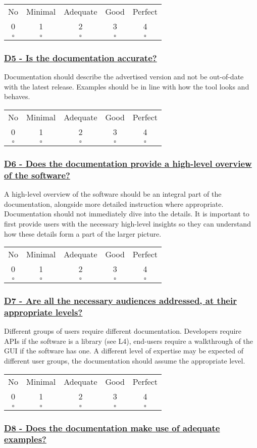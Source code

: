 \documentclass[a4paper,11pt]{article}
\newcommand{\criterion}[2]{\subsubsection*{\underline{#1 - #2}}\label{id:#1}}
\newcommand\CheckTable{%
  \begin{tabular}{ccccc}
    No & Minimal & Adequate & Good & Perfect \\
    0 & 1 & 2 & 3 & 4 \\
    \hline
    $\square$ & $\square$ & $\square$ & $\square$ & $\square$ \\
  \end{tabular}%
}
\begin{document}
%
%
%

\CheckTable

\newcommand{\dFiveID}{D5}
\newcommand{\dFiveText}{Is the documentation accurate?}
\criterion{\dFiveID}{\dFiveText}

Documentation should describe the advertised version and not be out-of-date
with the latest release. Examples should be in line with how the tool looks and
behaves.

\CheckTable

\newcommand{\dSixID}{D6}
\newcommand{\dSixText}{Does the documentation provide a high-level overview of the software?}
\criterion{\dSixID}{\dSixText}

A high-level overview of the software should be an integral part of the
documentation, alongside more detailed instruction where appropriate.
Documentation should not immediately dive into the details. It is important to
first provide users with the necessary high-level insights so they can understand how
these details form a part of the larger picture.


\CheckTable

\newcommand{\dSevenID}{D7}
\newcommand{\dSevenText}{Are all the necessary audiences addressed, at their appropriate levels?}
\criterion{\dSevenID}{\dSevenText}

Different groups of users require different documentation. Developers require
APIs if the software is a library (see L4), end-users require a walkthrough of the GUI
if the software has one. A different level of expertise may be expected of
different user groups, the documentation should assume the appropriate level.

\CheckTable

\newcommand{\dEightID}{D8}
\newcommand{\dEightText}{Does the documentation make use of adequate examples?}
\criterion{\dEightID}{\dEightText}
\end{document}
